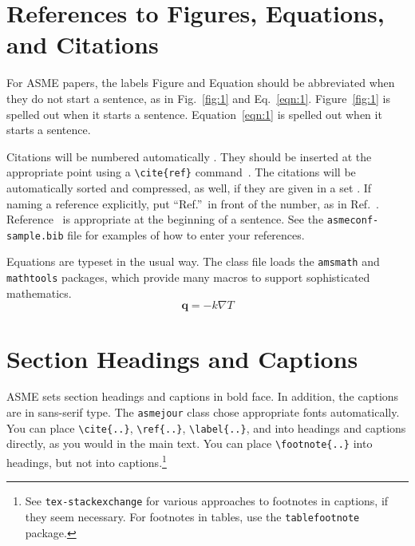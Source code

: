 \documentclass[balance,nocopyright,upint,varvw,hyphenate,barcolor=Goldenrod3,german]{asmejour}%
\begin{document}
\section{References to Figures, Equations, and Citations}

For ASME papers, the labels Figure and Equation should be abbreviated when they do not start a sentence, as in Fig.~\ref{fig:1} and Eq.~\eqref{eqn:1}. Figure~\ref{fig:1} is spelled out when it starts a sentence. Equation~\eqref{eqn:1} is spelled out when it starts a sentence.

Citations will be numbered automatically \cite{DKE1969}. They should be inserted at the appropriate point using a \verb|\cite{ref}| command~\cite{toohey2007,gibson2008}. The citations will be automatically sorted and compressed, as well, if they are given in a set \cite{stevens1999, DKE1969, wions2006, oligaria2011, mollen2014, smith2014, apple2019}. If naming a reference explicitly, put ``Ref.''\ in front of the number, as in Ref.~\cite{smith2014}. Reference~\cite{smith2014} is appropriate at the beginning of a sentence.
See the \texttt{asmeconf-sample.bib} file for examples of how to enter your references.

Equations are typeset in the usual way.  The class file loads the \texttt{amsmath} and \texttt{mathtools} packages, which provide many macros to support sophisticated mathematics.
\begin{equation}\label{eqn:1}
\mathbf{q} = -k\nabla T
\end{equation}


\section{Section Headings and Captions}

ASME sets section headings and captions in bold face. In addition, the captions are in sans-serif type. The \texttt{asmejour} class chose appropriate fonts automatically.  You can place \verb|\cite{..}|, \verb|\ref{..}|, \verb|\label{..}|, and into headings and captions directly, as you would in the main text.  You can place \verb|\footnote{..}| into headings, but not into captions.\footnote{See \texttt{tex-stackexchange} for various approaches to footnotes in captions, if they seem necessary. For footnotes in tables, use the \texttt{tablefootnote} package.}
\end{document}
